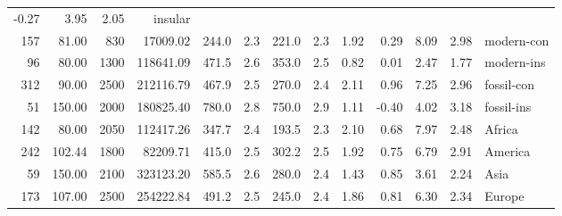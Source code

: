 \begin{landscape}
\begin{longtable}[]{@{}rrrrrrrrrrrrl@{}}
	-0.27 & 3.95 & 2.05 & insular\tabularnewline
	157 & 81.00 & 830 & 17009.02 & 244.0 & 2.3 & 221.0 & 2.3 & 1.92 & 0.29 &
	8.09 & 2.98 & modern-con\tabularnewline
	96 & 80.00 & 1300 & 118641.09 & 471.5 & 2.6 & 353.0 & 2.5 & 0.82 & 0.01
	& 2.47 & 1.77 & modern-ins\tabularnewline
	312 & 90.00 & 2500 & 212116.79 & 467.9 & 2.5 & 270.0 & 2.4 & 2.11 & 0.96
	& 7.25 & 2.96 & fossil-con\tabularnewline
	51 & 150.00 & 2000 & 180825.40 & 780.0 & 2.8 & 750.0 & 2.9 & 1.11 &
	-0.40 & 4.02 & 3.18 & fossil-ins\tabularnewline
	142 & 80.00 & 2050 & 112417.26 & 347.7 & 2.4 & 193.5 & 2.3 & 2.10 & 0.68
	& 7.97 & 2.48 & Africa\tabularnewline
	242 & 102.44 & 1800 & 82209.71 & 415.0 & 2.5 & 302.2 & 2.5 & 1.92 & 0.75
	& 6.79 & 2.91 & America\tabularnewline
	59 & 150.00 & 2100 & 323123.20 & 585.5 & 2.6 & 280.0 & 2.4 & 1.43 & 0.85
	& 3.61 & 2.24 & Asia\tabularnewline
	173 & 107.00 & 2500 & 254222.84 & 491.2 & 2.5 & 245.0 & 2.4 & 1.86 &
	0.81 & 6.30 & 2.34 & Europe\tabularnewline
	\bottomrule
\end{longtable}
\end{landscape}

%

%